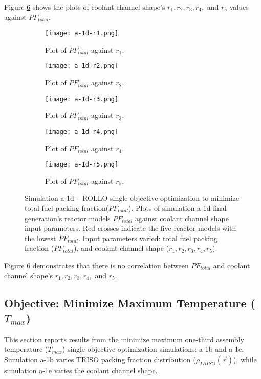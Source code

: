 Figure \ref{fig:a-1d} shows the plots of coolant channel shape's 
$r_1, r_2, r_3, r_4,$ and $r_5$ values against $PF_{total}$. 
\begin{figure}[htbp!]
    \centering
    \begin{subfigure}{0.49\textwidth}
        \texttt{[image: a-1d-r1.png]}
        \caption{Plot of $PF_{total}$ against $r_1$.}
        \label{fig:a-1d-r1} 
    \end{subfigure}
    \begin{subfigure}{0.49\textwidth}
        \texttt{[image: a-1d-r2.png]}
        \caption{Plot of $PF_{total}$ against $r_2$.}
        \label{fig:a-1d-r2} 
    \end{subfigure}
    \begin{subfigure}{0.49\textwidth}
        \texttt{[image: a-1d-r3.png]}
        \caption{Plot of $PF_{total}$ against $r_3$.}
        \label{fig:a-1d-r3} 
    \end{subfigure}
    \begin{subfigure}{0.49\textwidth}
        \texttt{[image: a-1d-r4.png]}
        \caption{Plot of $PF_{total}$ against $r_4$.}
        \label{fig:a-1d-r4} 
    \end{subfigure}
    \begin{subfigure}{0.49\textwidth}
        \texttt{[image: a-1d-r5.png]}
        \caption{Plot of $PF_{total}$ against $r_5$.}
        \label{fig:a-1d-r5} 
    \end{subfigure}
    \caption{Simulation a-1d -- ROLLO single-objective optimization to minimize 
    total fuel packing fraction($PF_{total}$). 
    Plots of simulation a-1d final generation's reactor models $PF_{total}$ against 
    coolant channel shape input parameters. 
    Red crosses indicate the five reactor models with the lowest $PF_{total}$.
    Input parameters varied: total fuel packing fraction 
    ($PF_{total}$), and coolant channel shape ($r_1, r_2, r_3, r_4, r_5$).}
    \label{fig:a-1d}
\end{figure}

Figure \ref{fig:a-1d} demonstrates that there is no correlation between $PF_{total}$ 
and coolant channel shape's $r_1, r_2, r_3, r_4,$ and $r_5$. 

\subsection{Objective: Minimize Maximum Temperature ($T_{max}$)}
\label{sec:assem-1-obj-temp}
This section reports results from the minimize maximum one-third assembly temperature 
($T_{max}$) single-objective optimization simulations: a-1b and a-1e. 
Simulation a-1b varies \gls{TRISO} packing fraction distribution 
($\rho_{TRISO}(\vec{r})$), while simulation a-1e varies the coolant channel shape. 


